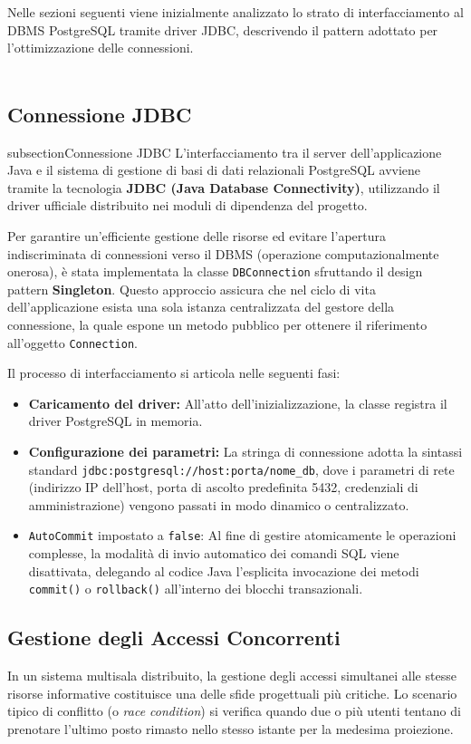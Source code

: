 \documentclass{article}
\begin{document}
Nelle sezioni seguenti viene inizialmente analizzato lo strato di interfacciamento al DBMS PostgreSQL tramite driver JDBC, descrivendo il pattern adottato per l'ottimizzazione delle connessioni. 
\\
\\
\subsection{Connessione JDBC}
subsection{Connessione JDBC}
L'interfacciamento tra il server dell'applicazione Java e il sistema di gestione di basi di dati relazionali PostgreSQL avviene tramite la tecnologia \textbf{JDBC (Java Database Connectivity)}, utilizzando il driver ufficiale distribuito nei moduli di dipendenza del progetto.

Per garantire un'efficiente gestione delle risorse ed evitare l'apertura indiscriminata di connessioni verso il DBMS (operazione computazionalmente onerosa), è stata implementata la classe \texttt{DBConnection} sfruttando il design pattern \textbf{Singleton}. Questo approccio assicura che nel ciclo di vita dell'applicazione esista una sola istanza centralizzata del gestore della connessione, la quale espone un metodo pubblico per ottenere il riferimento all'oggetto \texttt{Connection}.

Il processo di interfacciamento si articola nelle seguenti fasi:
\begin{itemize}
    \item \textbf{Caricamento del driver:} All'atto dell'inizializzazione, la classe registra il driver PostgreSQL in memoria.
    \item \textbf{Configurazione dei parametri:} La stringa di connessione adotta la sintassi standard \texttt{jdbc:postgresql://host:porta/nome\_db}, dove i parametri di rete (indirizzo IP dell'host, porta di ascolto predefinita 5432, credenziali di amministrazione) vengono passati in modo dinamico o centralizzato.
    \item \texttt{AutoCommit} impostato a \texttt{false}: Al fine di gestire atomicamente le operazioni complesse, la modalità di invio automatico dei comandi SQL viene disattivata, delegando al codice Java l'esplicita invocazione dei metodi \texttt{commit()} o \texttt{rollback()} all'interno dei blocchi transazionali.
\end{itemize}
\subsection{Gestione degli Accessi Concorrenti}
In un sistema multisala distribuito, la gestione degli accessi simultanei alle stesse risorse informative costituisce una delle sfide progettuali più critiche. Lo scenario tipico di conflitto (o \textit{race condition}) si verifica quando due o più utenti tentano di prenotare l'ultimo posto rimasto nello stesso istante per la medesima proiezione. 
\end{document}
